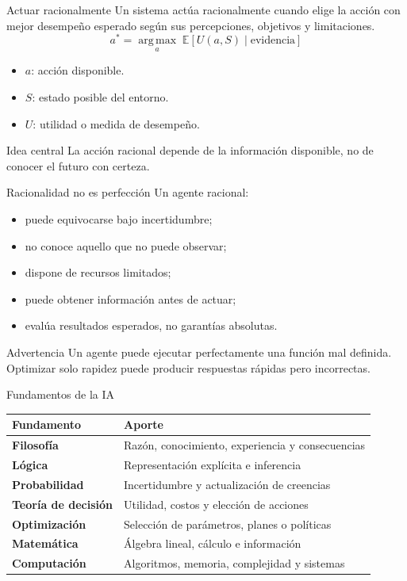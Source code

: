 \documentclass[aspectratio=169,11pt]{beamer}
\begin{document}
\begin{frame}{Actuar racionalmente}
  Un sistema actúa racionalmente cuando elige la acción con mejor desempeño esperado según sus percepciones, objetivos y limitaciones.
  \[
    a^* = \underset{a}{\operatorname{arg\,max}}\;
    \mathbb{E}\!\left[U(a,S)\mid\text{evidencia}\right]
  \]
  \begin{itemize}
    \item $a$: acción disponible.
    \item $S$: estado posible del entorno.
    \item $U$: utilidad o medida de desempeño.
  \end{itemize}
  \begin{block}{Idea central}
    La acción racional depende de la información disponible, no de conocer el futuro con certeza.
  \end{block}
\end{frame}

\begin{frame}{Racionalidad no es perfección}
  Un agente racional:
  \begin{itemize}
    \item puede equivocarse bajo incertidumbre;
    \item no conoce aquello que no puede observar;
    \item dispone de recursos limitados;
    \item puede obtener información antes de actuar;
    \item evalúa resultados esperados, no garantías absolutas.
  \end{itemize}
  \vfill
  \begin{alertblock}{Advertencia}
    Un agente puede ejecutar perfectamente una función mal definida. Optimizar solo rapidez puede producir respuestas rápidas pero incorrectas.
  \end{alertblock}
\end{frame}

\begin{frame}{Fundamentos de la IA}
  \scriptsize
  \begin{tabularx}{\textwidth}{>{\bfseries}p{} X}
    \toprule
    Fundamento & Aporte \\
    \midrule
    Filosofía & Razón, conocimiento, experiencia y consecuencias \\
    Lógica & Representación explícita e inferencia \\
    Probabilidad & Incertidumbre y actualización de creencias \\
    Teoría de decisión & Utilidad, costos y elección de acciones \\
    Optimización & Selección de parámetros, planes o políticas \\
    Matemática & Álgebra lineal, cálculo e información \\
    Computación & Algoritmos, memoria, complejidad y sistemas \\
    \bottomrule
  \end{tabularx}
\end{frame}
\end{document}
